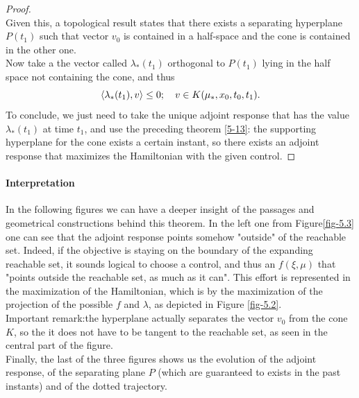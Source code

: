 \begin{proof}
\begin{minipage}{0.9\linewidth}
	\end{minipage}\\
	Given this, a topological result states that there exists a separating hyperplane $P(t_1)$ such that vector $v_0$ is contained in a half-space and the cone is contained in the other one.\\
	Now take a the vector called $\lambda_*(t_1)$ orthogonal to $P(t_1)$ lying in the half space not containing the cone, and thus \[\langle \lambda_*(t_1),v\rangle\leq0;\text{\space\space\space}v\in K(\mu_*,x_0,t_0,t_1).\]
	To conclude, we just need to take the unique adjoint response that has the value $\lambda_*(t_1)$ at time $t_1$, and use the preceding theorem \ref{5-13}: the supporting hyperplane for the cone exists a certain instant, so there exists an adjoint response that maximizes the Hamiltonian with the given control.
\end{proof}

\paragraph{Interpretation}
In the following figures we can have a deeper insight of the passages and geometrical constructions behind this theorem. In the left one from Figure\ref{fig-5.3} one can see that the adjoint response points somehow "outside" of the reachable set. Indeed, if the objective is staying on the boundary of the expanding reachable set, it sounds logical to choose a control, and thus an $f(\xi,\mu)$ that "points outside the reachable set, as much as it can". This effort is represented in the maximization of the Hamiltonian,  which is by the maximization of the projection of the possible $f$ and $\lambda$, as depicted in Figure \ref{fig-5.2}. \\
Important remark:the hyperplane actually separates the vector $v_0$ from the cone $K$, so the it does not have to be tangent to the reachable set, as seen in the central part of the figure.\\
Finally, the last of the three figures shows us the evolution of the adjoint response, of the separating plane $P$ (which are guaranteed to exists in the past instants) and of the dotted trajectory.

